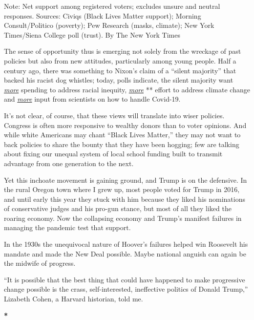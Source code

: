 Note: Net support among registered voters; excludes unsure and neutral
responses. Sources: Civiqs (Black Lives Matter support); Morning
Consult/Politico (poverty); Pew Research (masks, climate); New York
Times/Siena College poll (trust). \textbar{} By The New York Times

The sense of opportunity thus is emerging not solely from the wreckage
of past policies but also from new attitudes, particularly among young
people. Half a century ago, there was something to Nixon's claim of a
``silent majority'' that backed his racist dog whistles; today, polls
indicate, the silent majority want
\href{https://gssdataexplorer.norc.org/projects/82650/variables/188/vshow}{\emph{more}}
spending to address racial inequity,
\href{https://www.pewresearch.org/fact-tank/2020/04/21/how-americans-see-climate-change-and-the-environment-in-7-charts/}{\emph{more}}
** effort to address climate change and
\href{https://www.nytimes.com/2020/06/27/upshot/coronavirus-americans-trust-experts.html}{\emph{more}}
input from scientists on how to handle Covid-19.

It's not clear, of course, that these views will translate into wiser
policies. Congress is often more responsive to wealthy donors than to
voter opinions. And while white Americans may chant ``Black Lives
Matter,'' they may not want to back policies to share the bounty that
they have been hogging; few are talking about fixing our unequal system
of local school funding built to transmit advantage from one generation
to the next.

Yet this inchoate movement is gaining ground, and Trump is on the
defensive. In the rural Oregon town where I grew up, most people voted
for Trump in 2016, and until early this year they stuck with him because
they liked his nominations of conservative judges and his pro-gun
stance, but most of all they liked the roaring economy. Now the
collapsing economy and Trump's manifest failures in managing the
pandemic test that support.

In the 1930s the unequivocal nature of Hoover's failures helped win
Roosevelt his mandate and made the New Deal possible. Maybe national
anguish can again be the midwife of progress.

``It is possible that the best thing that could have happened to make
progressive change possible is the crass, self-interested, ineffective
politics of Donald Trump,'' Lizabeth Cohen, a Harvard historian, told
me.

\textbf{*}

